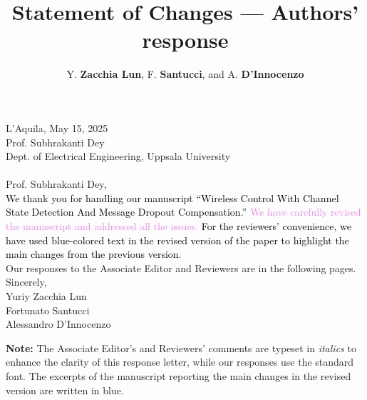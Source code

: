 \documentclass{article}
\title{\textbf{Statement of Changes --- Authors' response}}
\author{Y. \textbf{Zacchia Lun}, F. \textbf{Santucci}, and A. \textbf{D'Innocenzo}}
\date{\vspace{-5ex}}
\renewcommand{\!}{\tmspace-\thinmuskip{.1667em}}
\begin{document}
\thispagestyle{empty}
\hspace*{\fill} L'Aquila, {May 15, 2025}\\[1cm]
Prof. Subhrakanti Dey\\
Dept. of Electrical Engineering, Uppsala University\\\\
\noindent
Prof. Subhrakanti Dey,\\[2mm]
\indent \textcolor{black}{We thank you for handling our manuscript ``Wireless Control With Channel State Detection And Message Dropout Compensation.''
\textcolor{violet}{We have carefully revised the manuscript and addressed all the issues.} For the reviewers' convenience, we have used blue-colored text in the revised version of the paper to highlight the main changes from the previous version.}\\[2mm]
\indent Our responses to the Associate Editor and Reviewers are in the following pages.\\[4mm]
\noindent
Sincerely,\\[4mm]
\noindent
Yuriy Zacchia Lun\\
Fortunato Santucci\\
Alessandro D'Innocenzo\\

\clearpage
{}
\maketitle
\tableofcontents
\vspace{2cm}
\noindent \textbf{Note:} The Associate Editor's and Reviewers' comments are typeset in \textit{italics} to enhance the clarity of this response letter, while our responses use the standard font. The excerpts of the manuscript reporting the main changes in the revised version are written in blue.





\end{document}
